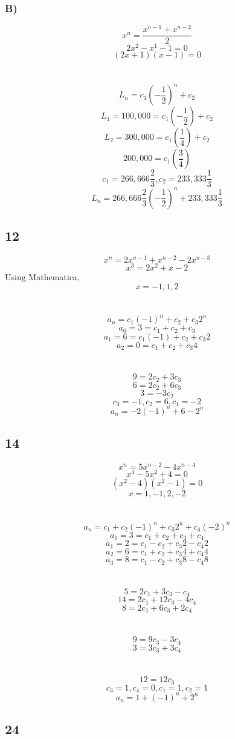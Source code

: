 \documentclass[journal]{IEEEtran}
\begin{document}
\subsubsection*{B)}
$$x^n = \frac{x^{n-1} + x^{n-2}}{2}$$
$$2x^2 - x^{1} - 1 = 0$$
$$(2x + 1)(x - 1) = 0$$
\\\\
$$L_n = c_1(-\frac{1}{2})^n + c_2$$
$$L_1 = 100,000 = c_1(-\frac{1}{2}) + c_2$$
$$L_2 = 300,000 = c_1(\frac{1}{4}) + c_2$$
$$200,000 = c_1(\frac{3}{4})$$
$$c_1 = 266,666 \frac{2}{3}, c_2 = 233,333 \frac{1}{3}$$
$$\boxed{L_n = 266,666 \frac{2}{3}(-\frac{1}{2})^n + 233,333 \frac{1}{3}}$$

\subsection*{12}
$$x^n = 2x^{n-1} + x^{n-2} - 2 x^{n-3}$$
$$x^3 = 2x^2 + x - 2$$
Using Mathematica,
$$x = -1, 1, 2$$
\\\\
$$a_n = c_1(-1)^n + c_2 + c_3 2^n$$
$$a_0 =3= c_1 + c_2 + c_3$$
$$a_1 =6= c_1(-1) + c_2 + c_3 2$$
$$a_2 =0= c_1 + c_2 + c_3 4$$
\\\\
$$9=  2 c_2 + 3 c_3$$
$$6 = 2c_2 + 6c_3$$
$$3 = -3c_2$$
$$c_3 = -1, c_2 = 6, c_1 = -2$$
$$\boxed{a_n = -2(-1)^n + 6 - 2^n}$$

\subsection*{14}
$$x^n = 5 x^{n-2} - 4 x^{n-4}$$
$$x^4 - 5 x^2 + 4 = 0$$
$$(x^2 - 4)(x^2 - 1) = 0$$
$$x = 1, -1, 2, -2$$
\\\\
$$a_n = c_1 + c_2 (-1)^n + c_3 2^n + c_4 (-2)^n$$
$$a_0 =3= c_1 + c_2 + c_3 + c_4$$
$$a_1 =2= c_1 - c_2 + c_3 2 - c_4 2$$
$$a_2 =6= c_1 + c_2 + c_3 4 + c_4 4$$
$$a_3 =8= c_1 - c_2 + c_3 8 - c_4 8$$
\\\\
$$5 = 2c_1 + 3 c_3 - c_4$$
$$14 = 2c_1 + 12 c_3 - 4 c_4$$
$$8 = 2c_1 + 6 c_3 + 2 c_4$$
\\\\
$$9 = 9c_3 - 3c_4$$
$$3 = 3c_3 + 3c_4$$
\\\\
$$12 = 12c_3$$
$$c_3 = 1, c_4 = 0, c_1 = 1, c_2 = 1$$
$$\boxed{a_n = 1 + (-1)^n + 2^n}$$


\subsection*{24}
\end{document}
